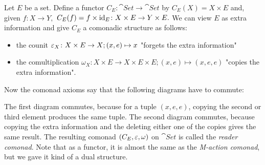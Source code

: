 \begin{example}
    Let $E$ be a set. Define a functor $C_E \colon \cat{Set} \to \cat{Set}$ by
    $C_E(X)=X \times E$ and, given $f \colon X \to Y,$ $C_E(f) = f \times \operatorname{id}_E
    \colon X \times E \to Y \times E.$
    We can view $E$ as \dq extra information\dq{} and give $C_E$ a comonadic structure as follows:
    \begin{itemize}
        \item the counit $\varepsilon_X \colon X \times E \to X; (x,e)\mapsto x$ 
         "forgets the extra information"
        \item the comultiplication $\omega_X \colon X \times E \to X \times E \times E;
        (x,e)\mapsto (x,e,e)$ 
        "copies the extra information".
    \end{itemize}
    Now the comonad axioms say that the following diagrams have to commute:
    \begin{figure}[H]
        \small
    \centering
    \begin{subfigure}{0.45\textwidth}
    \centering
    \end{subfigure}
    \hspace{2em}
    \begin{subfigure}{0.46\textwidth}
    \centering
    \end{subfigure}
    \end{figure}
    The first diagram commutes, because for a tuple $(x,e,e)$, copying the second or 
    third element produces the same tuple. The second diagram commutes, because copying 
    the extra information and the deleting either one of the copies gives the same result.
    The resulting comonad $(C_E,\varepsilon,\omega)$ on $\cat{Set}$ is called the \textit{reader comonad}.
    Note that as a functor, it is almost the same as the \textit{M-action comonad}, but we gave it
    kind of a dual structure.
\end{example}


